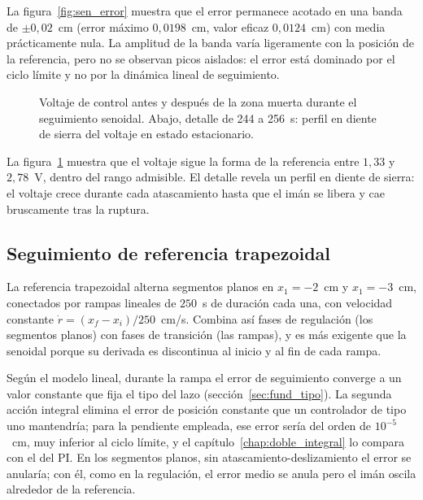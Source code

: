 La figura~\ref{fig:sen_error} muestra que el error permanece acotado en una banda de $\pm 0{,}02$~cm (error máximo $0{,}0198$~cm, valor eficaz $0{,}0124$~cm) con media prácticamente nula. La amplitud de la banda varía ligeramente con la posición de la referencia, pero no se observan picos aislados: el error está dominado por el ciclo límite y no por la dinámica lineal de seguimiento.

\FloatBarrier

\begin{figure}[ht]
    \centering
    
    \caption[Seguimiento senoidal: señal de control]{Voltaje de control antes y después de la zona muerta durante el seguimiento senoidal. Abajo, detalle de 244 a 256~s: perfil en diente de sierra del voltaje en estado estacionario.}
    \label{fig:sen_ctrl}
\end{figure}

La figura~\ref{fig:sen_ctrl} muestra que el voltaje sigue la forma de la referencia entre $1{,}33$ y $2{,}78$~V, dentro del rango admisible. El detalle revela un perfil en diente de sierra: el voltaje crece durante cada atascamiento hasta que el imán se libera y cae bruscamente tras la ruptura.

\FloatBarrier

\subsection{Seguimiento de referencia trapezoidal}

La referencia trapezoidal alterna segmentos planos en $x_1 = -2$~cm y $x_1 = -3$~cm, conectados por rampas lineales de $250$~s de duración cada una, con velocidad constante $\dot{r} = (x_{f}-x_{i})/250$~cm/s. Combina así fases de regulación (los segmentos planos) con fases de transición (las rampas), y es más exigente que la senoidal porque su derivada es discontinua al inicio y al fin de cada rampa.

Según el modelo lineal, durante la rampa el error de seguimiento converge a un valor constante que fija el tipo del lazo (sección~\ref{sec:fund_tipo}). La segunda acción integral elimina el error de posición constante que un controlador de tipo uno mantendría; para la pendiente empleada, ese error sería del orden de $10^{-5}$~cm, muy inferior al ciclo límite, y el capítulo~\ref{chap:doble_integral} lo compara con el del PI. En los segmentos planos, sin atascamiento-deslizamiento el error se anularía; con él, como en la regulación, el error medio se anula pero el imán oscila alrededor de la referencia.

